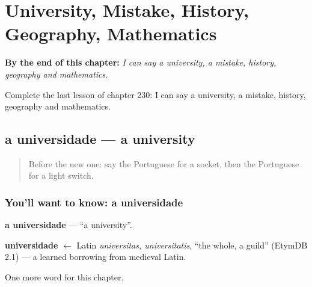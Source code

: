 
\chapter{University, Mistake, History, Geography, Mathematics}
\label{ch:pt-university-mistake-history-geography-mathematics}

\begin{chapteropening}
\textbf{By the end of this chapter:} \emph{I can say a university, a mistake, history, geography and mathematics.}

Complete the last lesson of chapter 230: I can say a university, a mistake, history, geography and mathematics.
\end{chapteropening}

\section[a universidade]{a universidade — a university}

\label{lesson:PT-C230-universidade}



\begin{quote}
Before the new one: say the Portuguese for a socket, then the Portuguese for a light switch.
\end{quote}

\subsection*{You'll want to know: a universidade}
\textbf{a universidade} — \textquotedblleft{}a university\textquotedblright{}.

\begin{cousinweb}
\textbf{universidade} $\leftarrow$ Latin \emph{universitas, universitatis}, \textquotedblleft{}the whole, a guild\textquotedblright{} (EtymDB 2.1) — a learned borrowing from medieval Latin.
\end{cousinweb}

\begin{grammarlens}[title={What you've built}]
One more word for this chapter.
\end{grammarlens}

